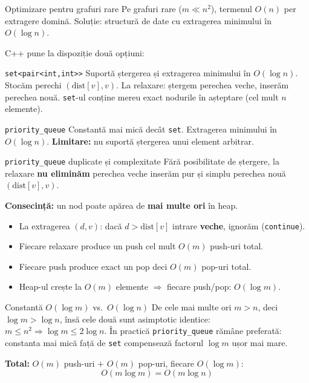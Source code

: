 \documentclass[10pt]{beamer}
\begin{document}
\begin{frame}{Optimizare pentru grafuri rare}
  Pe grafuri rare ($m \ll n^2$), termenul $O(n)$ per extragere domină.
  Soluție: structură de date cu extragerea minimului în $O(\log n)$.

  \smallskip
  C++ pune la dispoziție două opțiuni:

  \begin{block}{\texttt{set<pair<int,int>{}>}}
    Suportă ștergerea și extragerea minimului în $O(\log n)$.
    Stocăm perechi $(\text{dist}[v], v)$.
    La relaxare: ștergem perechea veche, inserăm perechea nouă.
    \texttt{set}-ul conține mereu exact nodurile în așteptare (cel mult $n$ elemente).
  \end{block}

  \begin{block}{\texttt{priority\_queue}}
    Constantă mai mică decât \texttt{set}.
    Extragerea minimului în $O(\log n)$.
    \textbf{Limitare:} nu suportă ștergerea unui element arbitrar.
  \end{block}
\end{frame}

\begin{frame}{\texttt{priority\_queue} \textemdash{} duplicate și complexitate}
  Fără posibilitate de ștergere, la relaxare \textbf{nu eliminăm} perechea veche
  \textemdash{} inserăm pur și simplu perechea nouă $(\text{dist}[v], v)$.

  \smallskip
  \textbf{Consecință:} un nod poate apărea de \textbf{mai multe ori} în heap.
  \begin{itemize}
    \item La extragerea $(d, v)$: dacă $d > \text{dist}[v]$ \textemdash{}
          intrare \textbf{veche}, ignorăm (\texttt{continue}).
    \item Fiecare relaxare produce un push \textemdash{} cel mult $O(m)$ push-uri total.
    \item Fiecare push produce exact un pop \textemdash{} deci $O(m)$ pop-uri total.
    \item Heap-ul crește la $O(m)$ elemente $\Rightarrow$ fiecare push/pop: $O(\log m)$.
  \end{itemize}

  \begin{alertblock}{Constantă \textemdash{} $O(\log m)$ vs.\ $O(\log n)$}
    De cele mai multe ori $m > n$, deci $\log m > \log n$, însă cele două sunt asimptotic
    identice: $m \leq n^2 \Rightarrow \log m \leq 2\log n$.
    În practică \texttt{priority\_queue} rămâne preferată: constanta mai mică față
    de \texttt{set} compensează factorul $\log m$ ușor mai mare.
  \end{alertblock}

  \textbf{Total:} $O(m)$ push-uri $+$ $O(m)$ pop-uri, fiecare $O(\log m)$:
  \[ O(m \log m) = O(m \log n) \]
\end{frame}
\end{document}
